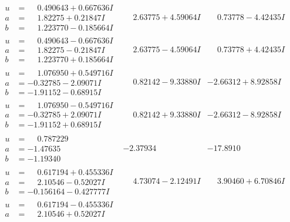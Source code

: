 \documentclass[1p]{elsarticle_modified}
\theoremstyle{definition}
\begin{document}
$$\begin{array}{c|c|c}
\begin{aligned}
u &= \phantom{-}0.490643 + 0.667636 I \\
a &= \phantom{-}1.82275 + 0.21847 I \\
b &= \phantom{-}1.223770 - 0.185664 I\end{aligned}
 & \phantom{-}2.63775 + 4.59064 I & \phantom{-}0.73778 - 4.42435 I \\ \hline\begin{aligned}
u &= \phantom{-}0.490643 - 0.667636 I \\
a &= \phantom{-}1.82275 - 0.21847 I \\
b &= \phantom{-}1.223770 + 0.185664 I\end{aligned}
 & \phantom{-}2.63775 - 4.59064 I & \phantom{-}0.73778 + 4.42435 I \\ \hline\begin{aligned}
u &= \phantom{-}1.076950 + 0.549716 I \\
a &= -0.32785 - 2.09071 I \\
b &= -1.91152 - 0.68915 I\end{aligned}
 & \phantom{-}0.82142 - 9.33880 I & -2.66312 + 8.92858 I \\ \hline\begin{aligned}
u &= \phantom{-}1.076950 - 0.549716 I \\
a &= -0.32785 + 2.09071 I \\
b &= -1.91152 + 0.68915 I\end{aligned}
 & \phantom{-}0.82142 + 9.33880 I & -2.66312 - 8.92858 I \\ \hline\begin{aligned}
u &= \phantom{-}0.787229\phantom{ +0.000000I} \\
a &= -1.47635\phantom{ +0.000000I} \\
b &= -1.19340\phantom{ +0.000000I}\end{aligned}
 & -2.37934\phantom{ +0.000000I} & -17.8910\phantom{ +0.000000I} \\ \hline\begin{aligned}
u &= \phantom{-}0.617194 + 0.455336 I \\
a &= \phantom{-}2.10546 - 0.52027 I \\
b &= -0.156164 - 0.427777 I\end{aligned}
 & \phantom{-}4.73074 - 2.12491 I & \phantom{-}3.90460 + 6.70846 I \\ \hline\begin{aligned}
u &= \phantom{-}0.617194 - 0.455336 I \\
a &= \phantom{-}2.10546 + 0.52027 I \\

\end{aligned}
\end{array}$$
\end{document}
